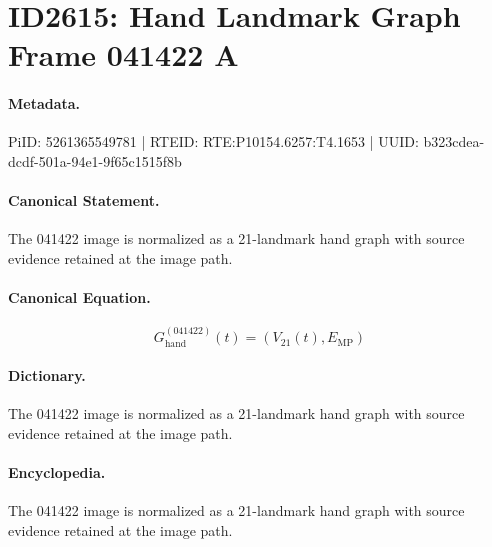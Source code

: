 \section*{ID2615: Hand Landmark Graph Frame 041422 A}
\paragraph{Metadata.}
PiID: 5261365549781 | RTEID: RTE:P10154.6257:T4.1653 | UUID: b323cdea-dcdf-501a-94e1-9f65c1515f8b

\paragraph{Canonical Statement.}
The 041422 image is normalized as a 21-landmark hand graph with source evidence retained at the image path.

\paragraph{Canonical Equation.}
\[
G_{\mathrm{hand}}^{(041422)}(t)=\left(V_{21}(t),E_{\mathrm{MP}}\right)
\]

\paragraph{Dictionary.}
The 041422 image is normalized as a 21-landmark hand graph with source evidence retained at the image path.

\paragraph{Encyclopedia.}
The 041422 image is normalized as a 21-landmark hand graph with source evidence retained at the image path.
